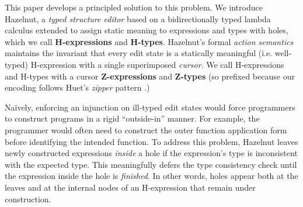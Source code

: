 This paper develops a principled solution to this problem. We introduce Hazelnut,  a \emph{typed structure editor}  based on a bidirectionally typed lambda calculus extended to assign static meaning to expressions and types with {holes}, which we call \textbf{H-expressions} and \textbf{H-types}. Hazelnut's formal \emph{action semantics} maintains the invariant that every edit state is a statically meaningful (i.e. well-typed) H-expression with a single superimposed \emph{cursor}. We call H-expressions and H-types with a cursor \textbf{Z-expressions} and \textbf{Z-types} (so prefixed because our encoding follows Huet's \emph{zipper} pattern \cite{JFP::Huet1997}.) %

Na\"ively, enforcing an injunction on ill-typed edit states would force programmers to construct programs in a rigid ``outside-in'' manner. For example, the programmer would often need to construct the outer function application form before identifying the intended function. To address this problem, Hazelnut leaves newly constructed expressions \emph{inside} a hole if the expression's type is inconsistent with the expected type. This meaningfully defers the type consistency check until the expression inside the hole is \emph{finished}. In other words, holes appear both at the leaves and at the internal nodes of an H-expression that remain under construction. %




